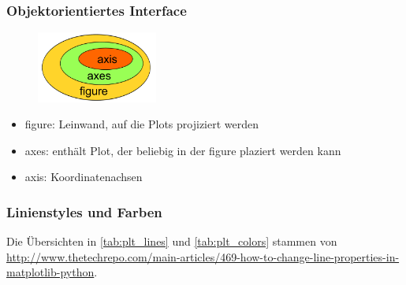 \subsubsection{Objektorientiertes Interface}
\begin{figure}[H]
  \includegraphics[width=150px]{img/matplotlib_v.png}
\end{figure}
\begin{itemize}
  \item figure: Leinwand, auf die Plots projiziert werden
  \item axes: enthält Plot, der beliebig in der figure plaziert werden kann
  \item axis: Koordinatenachsen 
\end{itemize}

\subsubsection{Linienstyles und Farben}
Die Übersichten in \autoref{tab:plt_lines} und \autoref{tab:plt_colors} stammen von \url{http://www.thetechrepo.com/main-articles/469-how-to-change-line-properties-in-matplotlib-python}.

